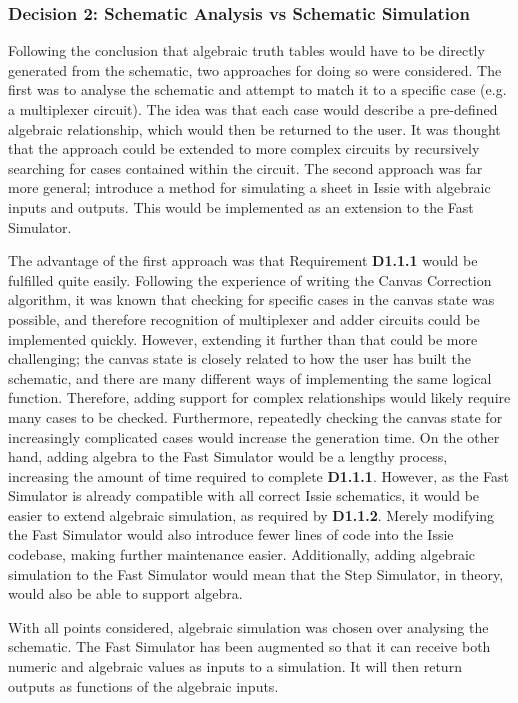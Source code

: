 \subsubsection{Decision 2: Schematic Analysis vs Schematic Simulation}
Following the conclusion that algebraic truth tables would have to be directly generated from the schematic, two approaches for doing so were considered. The first was to analyse the schematic and attempt to match it to a specific case (e.g. a multiplexer circuit). The idea was that each case would describe a pre-defined algebraic relationship, which would then be returned to the user. It was thought that the approach could be extended to more complex circuits by recursively searching for cases contained within the circuit. 
The second approach was far more general; introduce a method for simulating a sheet in Issie with algebraic inputs and outputs. This would be implemented as an extension to the Fast Simulator.

The advantage of the first approach was that Requirement \textbf{D1.1.1} would be fulfilled quite easily. Following the experience of writing the Canvas Correction algorithm, it was known that checking for specific cases in the canvas state was possible, and therefore recognition of multiplexer and adder circuits could be implemented quickly. However, extending it further than that could be more challenging; the canvas state is closely related to how the user has built the schematic, and there are many different ways of implementing the same logical function. Therefore, adding support for complex relationships would likely require many cases to be checked. Furthermore, repeatedly checking the canvas state for increasingly complicated cases would increase the generation time. On the other hand, adding algebra to the Fast Simulator would be a lengthy process, increasing the amount of time required to complete \textbf{D1.1.1}. However, as the Fast Simulator is already compatible with all correct Issie schematics, it would be easier to extend algebraic simulation, as required by \textbf{D1.1.2}. Merely modifying the Fast Simulator would also introduce fewer lines of code into the Issie codebase, making further maintenance easier. Additionally, adding algebraic simulation to the Fast Simulator would mean that the Step Simulator, in theory, would also be able to support algebra. 

With all points considered, algebraic simulation was chosen over analysing the schematic. The Fast Simulator has been augmented so that it can receive both numeric and algebraic values as inputs to a simulation. It will then return outputs as functions of the algebraic inputs.
